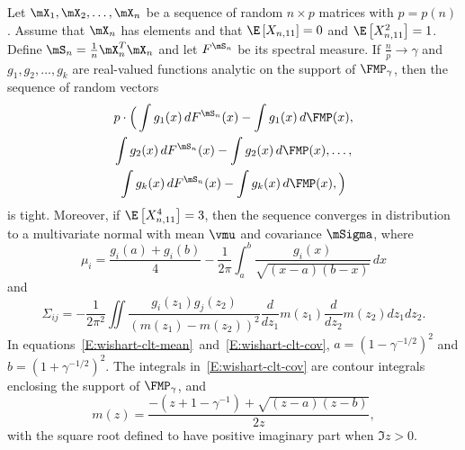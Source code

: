 \begin{theorem}
    Let $\mX_1, \mX_2, \ldots, \mX_n$ be a sequence of random $n\times p$ 
    matrices with $p = p(n)$.  Assume that $\mX_n$ has \iid elements and that 
    $\E\left[ X_{n,11} \right] = 0$ and $\E\left[ X_{n,11}^2 \right] = 1$.  
    Define $\mS_n = \frac{1}{n} \mX_n^T \mX_n$ and let $F^{\mS_n}$ be its 
    spectral measure.  If $\frac{n}{p} \to \gamma$ and $g_1, g_2, \ldots, g_k$ 
    are real-valued functions analytic on the support of $\FMP_\gamma$, then 
    the sequence of random vectors
    \begin{multline*}
        p
        \cdot
        \Big(
	    \int g_1(x) \, dF^{\mS_n}(x)
	    -
            \int g_1(x) \, d\FMP(x), \\
	    \int g_2(x) \, dF^{\mS_n}(x)
	    -
	    \int g_2(x) \, d\FMP(x),
	    \ldots, \\
            \int g_k(x) \, dF^{\mS_n}(x)
	    -
            \int g_k(x) \, d\FMP(x),
	\Big)
    \end{multline*}
    is tight.
    Moreover, if $\E \left[ X_{n,11}^4 \right] = 3$, then the sequence 
    converges in distribution to a multivariate normal with mean $\vmu$ and 
    covariance $\mSigma$, where 
    \begin{equation}\label{E:wishart-clt-mean}
        \mu_i
	    =
	    \frac{ g_i(a) + g_i(b) }
                 { 4 }
	    -
            \frac{1}{2 \pi}
	    \int_{a}^{b}
	        \frac{ g_i(x) }
	             { \sqrt{(x-a)(b-x)} }
                \,
                dx
    \end{equation}
    and
    \begin{equation}\label{E:wishart-clt-cov}
    	\Sigma_{ij}
    	=
    	-
    	\frac{1}{2 \pi^2}
    	\iint
    	    \frac{g_i(z_1) g_j(z_2)}
    	         {\left( m(z_1) - m(z_2) \right)^2}
    	    \frac{d}{dz_1} m(z_1)
    	    \frac{d}{dz_2} m(z_2)
    	    dz_1 dz_2.
    \end{equation}
    In equations~\eqref{E:wishart-clt-mean}~and~\eqref{E:wishart-clt-cov},
    $a = (1 - \gamma^{-1/2})^2$ and $b = (1 + \gamma^{-1/2})^2$.  The 
    integrals in~\eqref{E:wishart-clt-cov} are contour integrals enclosing the 
    support of $\FMP_\gamma$, and
    \begin{equation}
        m(z)
        =
	    \frac{-(z + 1 - \gamma^{-1}) + \sqrt{(z-a)(z-b)}}{2 z},
    \end{equation}
    with the square root defined to have positive imaginary part when
    $\Im z > 0$.
\end{theorem}

